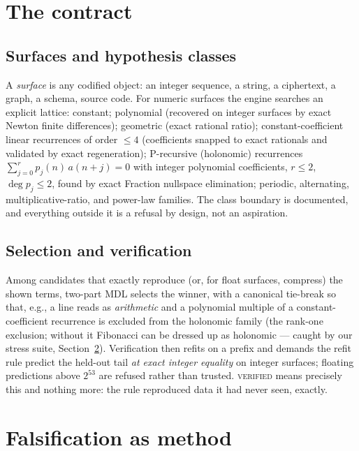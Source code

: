 \documentclass[11pt]{article}
\newcommand{\Verified}{\textsc{verified}}
\begin{document}
\section{The contract}\label{sec:contract}
\subsection{Surfaces and hypothesis classes}
A \emph{surface} is any codified object: an integer sequence, a string, a
ciphertext, a graph, a schema, source code. For numeric surfaces the engine
searches an explicit lattice: constant; polynomial (recovered on integer
surfaces by exact Newton finite differences); geometric (exact rational
ratio); constant-coefficient linear recurrences of order $\le 4$
(coefficients snapped to exact rationals and validated by exact
regeneration); P-recursive (holonomic) recurrences
$\sum_{j=0}^{r} p_j(n)\,a(n{+}j)=0$ with integer polynomial coefficients,
$r\le2$, $\deg p_j\le2$, found by exact Fraction nullspace elimination;
periodic, alternating, multiplicative-ratio, and power-law families.
The class boundary is documented, and everything outside it is a refusal by
design, not an aspiration.

\subsection{Selection and verification}
Among candidates that exactly reproduce (or, for float surfaces, compress)
the shown terms, two-part MDL selects the winner, with a canonical tie-break
so that, e.g., a line reads as \emph{arithmetic} and a polynomial multiple
of a constant-coefficient recurrence is excluded from the holonomic family
(the rank-one exclusion; without it Fibonacci can be dressed up as
holonomic --- caught by our stress suite, Section~\ref{sec:falsification}).
Verification then refits on a prefix and demands the refit rule predict the
held-out tail \emph{at exact integer equality} on integer surfaces; floating
predictions above $2^{53}$ are refused rather than trusted. \Verified{}
means precisely this and nothing more: the rule reproduced data it had
never seen, exactly.

\section{Falsification as method}\label{sec:falsification}
\end{document}
